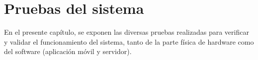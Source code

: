 
\chapter{Pruebas del sistema}\label{chapter6}
En el presente capítulo, se exponen las diversas pruebas realizadas para verificar y validar el funcionamiento del sistema, tanto de la parte física de hardware como del software (aplicación móvil y servidor).





